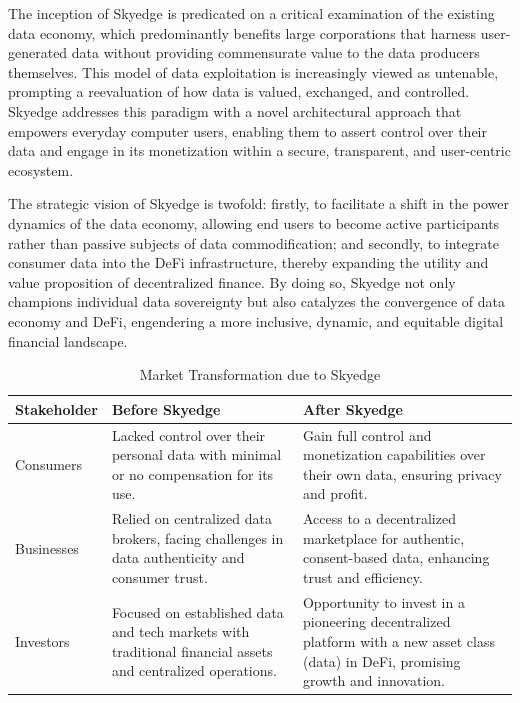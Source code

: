 \documentclass{article}
\begin{document}
The inception of Skyedge is predicated on a critical examination of the existing data economy, which predominantly benefits large corporations that harness user-generated data without providing commensurate value to the data producers themselves. This model of data exploitation is increasingly viewed as untenable, prompting a reevaluation of how data is valued, exchanged, and controlled. Skyedge addresses this paradigm with a novel architectural approach that empowers everyday computer users, enabling them to assert control over their data and engage in its monetization within a secure, transparent, and user-centric ecosystem.

The strategic vision of Skyedge is twofold: firstly, to facilitate a shift in the power dynamics of the data economy, allowing end users to become active participants rather than passive subjects of data commodification; and secondly, to integrate consumer data into the DeFi infrastructure, thereby expanding the utility and value proposition of decentralized finance. By doing so, Skyedge not only champions individual data sovereignty but also catalyzes the convergence of data economy and DeFi, engendering a more inclusive, dynamic, and equitable digital financial landscape.

\begin{table}[h!]
\centering
\begin{tabular}{|p{2cm}|p{4.5cm}|p{4.5cm}|}
\hline
\textbf{Stakeholder} & \textbf{Before Skyedge} & \textbf{After Skyedge} \\
\hline
Consumers & Lacked control over their personal data with minimal or no compensation for its use. & Gain full control and monetization capabilities over their own data, ensuring privacy and profit. \\
\hline
Businesses & Relied on centralized data brokers, facing challenges in data authenticity and consumer trust. & Access to a decentralized marketplace for authentic, consent-based data, enhancing trust and efficiency. \\
\hline
Investors & Focused on established data and tech markets with traditional financial assets and centralized operations. & Opportunity to invest in a pioneering decentralized platform with a new asset class (data) in DeFi, promising growth and innovation. \\
\hline
\end{tabular}
\caption{Market Transformation due to Skyedge}
\label{tab:market_transformation}
\end{table}
\end{document}

